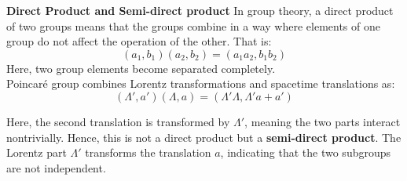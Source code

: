 \documentclass[14pt]{article} %
\begin{document}
\begin{tcolorbox}[ title=\textbf{Note:}]
\textbf{Direct Product and Semi-direct product}
\newline
In group theory, a direct product of two groups means that the groups combine in a way where elements of one group do not affect the operation of the other. That is:
\[
(a_1, b_1)(a_2, b_2) = (a_1 a_2, b_1 b_2)
\]
Here, two group elements become separated completely.\\
Poincaré group combines Lorentz transformations and spacetime translations as:
\[
(\Lambda', a')(\Lambda, a) = (\Lambda'\Lambda, \Lambda'a + a')
\]

Here, the second translation is transformed by $\Lambda'$, meaning the two parts interact nontrivially. Hence, this is not a direct product but a \textbf{semi-direct product}. The Lorentz part $\Lambda'$ transforms the translation $a$, indicating that the two subgroups are not independent.
\end{tcolorbox}
\vspace{-0.7cm}
\end{document}
